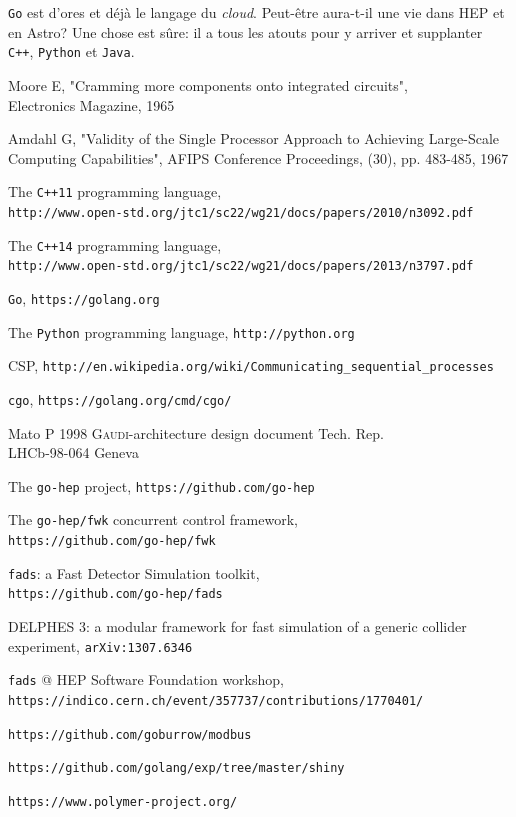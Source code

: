 \documentclass[a4paper,french]{article}
\begin{document}
\texttt{Go} est d'ores et d\'ej\`a le langage du \emph{cloud}.
Peut-\^etre aura-t-il une vie dans HEP et en Astro?
Une chose est s\^ure: il a tous les atouts pour y arriver et supplanter
\texttt{C++}, \texttt{Python} et \texttt{Java}.

\begin{thebibliography}{9}
	 Moore E, "Cramming more components onto integrated circuits",
		\\ Electronics Magazine, 1965
	
	 Amdahl G, "Validity of the Single Processor Approach to Achieving Large-Scale Computing Capabilities", AFIPS Conference Proceedings, (30), pp. 483-485, 1967
	
	 The \texttt{C++11} programming language, \\
		\verb'http://www.open-std.org/jtc1/sc22/wg21/docs/papers/2010/n3092.pdf'

	 The \texttt{C++14} programming language, \\
		\verb'http://www.open-std.org/jtc1/sc22/wg21/docs/papers/2013/n3797.pdf'

	 \texttt{Go},
		\verb'https://golang.org'

	 The \texttt{Python} programming language,
		\verb'http://python.org'

	 CSP,
		 \verb'http://en.wikipedia.org/wiki/Communicating_sequential_processes'

	 \texttt{cgo},
		\verb'https://golang.org/cmd/cgo/'

	 Mato P 1998 \textsc{Gaudi}-architecture design document Tech.
		Rep.\\ LHCb-98-064 Geneva
	
	 The \texttt{go-hep} project,
		\verb'https://github.com/go-hep'


	 The \texttt{go-hep/fwk} concurrent control
		framework,\\
		\verb'https://github.com/go-hep/fwk'

	 \texttt{fads}: a Fast Detector Simulation toolkit,\\
		\verb'https://github.com/go-hep/fads'

	 DELPHES 3: a modular framework for fast simulation of
		a generic collider experiment,
		\verb'arXiv:1307.6346'

	 \texttt{fads} @ HEP Software Foundation workshop,\\
		\verb'https://indico.cern.ch/event/357737/contributions/1770401/'

	 \verb'https://github.com/goburrow/modbus'

	\verb'https://github.com/golang/exp/tree/master/shiny'

	 \verb'https://www.polymer-project.org/'
	
\end{thebibliography}
\end{document}
